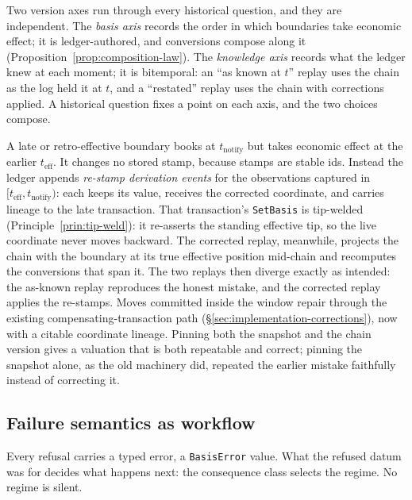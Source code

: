 Two version axes run through every historical question, and they are independent. The
\emph{basis axis} records the order in which boundaries take economic effect; it is
ledger-authored, and conversions compose along it
(Proposition~\ref{prop:composition-law}). The \emph{knowledge axis} records what the
ledger knew at each moment; it is bitemporal: an ``as known at $t$'' replay uses the
chain as the log held it at $t$, and a ``restated'' replay uses the chain with
corrections applied. A historical question fixes a point on each axis, and the two
choices compose.

A late or retro-effective boundary books at $t_{\mathrm{notify}}$ but takes economic
effect at the earlier $t_{\mathrm{eff}}$. It changes no stored stamp, because stamps
are stable ids. Instead the ledger appends \emph{re-stamp derivation events} for the
observations captured in $[t_{\mathrm{eff}},t_{\mathrm{notify}})$: each keeps its
value, receives the corrected coordinate, and carries lineage to the late transaction.
That transaction's \texttt{SetBasis} is tip-welded
(Principle~\ref{prin:tip-weld}): it re-asserts the standing effective tip, so the live
coordinate never moves backward. The corrected replay, meanwhile, projects the chain with
the boundary at its true effective position mid-chain and recomputes the conversions that
span it. The two replays then diverge exactly as intended: the as-known replay
reproduces the honest mistake, and the corrected replay applies the re-stamps. Moves
committed inside the window repair through the existing compensating-transaction path
(\S\ref{sec:implementation-corrections}), now with a citable coordinate lineage. Pinning both the snapshot and the chain
version gives a valuation that is both
repeatable and correct; pinning the snapshot alone, as the old machinery did, repeated
the earlier mistake faithfully instead of correcting it.

\subsection{Failure semantics as workflow}
\label{sec:basis-failure}

Every refusal carries a typed error, a \texttt{BasisError} value. What the refused
datum was for decides what happens next: the consequence class selects the regime. No
regime is silent.

